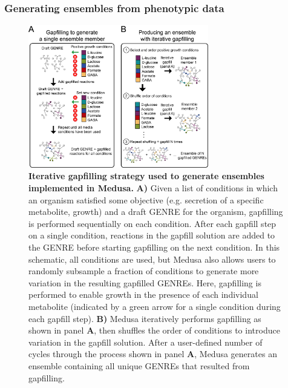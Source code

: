 \documentclass[11pt,twocolumn,notitlepage,openany,twoside]{book}
\begin{document}
\begin{refsection}
\subsubsection{Generating ensembles from phenotypic data}

\begin{figure}[!tb]
\centering
\includegraphics[width=0.7\textwidth]{ch4_fig4}
\caption[ Iterative gapfilling strategy used to generate ensembles implemented in Medusa.]{\textbf{ Iterative gapfilling strategy used to generate ensembles implemented in Medusa.}  \textbf{A)} Given a list of conditions in which an organism satisfied some objective (e.g. secretion of a specific metabolite, growth) and a draft GENRE for the organism, gapfilling is performed sequentially on each condition. After each gapfill step on a single condition, reactions in the gapfill solution are added to the GENRE before starting gapfilling on the next condition. In this schematic, all conditions are used, but Medusa also allows users to randomly subsample a fraction of conditions to generate more variation in the resulting gapfilled GENREs. Here, gapfilling is performed to enable growth in the presence of each individual metabolite (indicated by a green arrow for a single condition during each gapfill step). \textbf{B)} Medusa iteratively performs gapfilling as shown in panel \textbf{A}, then shuffles the order of conditions to introduce variation in the gapfill solution. After a user-defined number of cycles through the process shown in panel \textbf{A}, Medusa generates an ensemble containing all unique GENREs that resulted from gapfilling.}
\end{figure}


\end{refsection}
\end{document}

